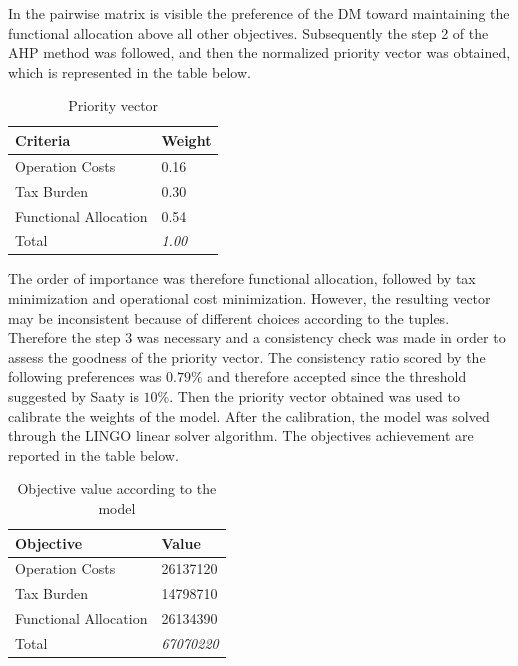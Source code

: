 \begin{doublespace}
In the pairwise matrix is visible the preference of the DM toward maintaining the functional allocation above all other objectives. Subsequently the step 2 of the AHP method was followed, and then the normalized priority vector was obtained, which is represented in the table below.

\begin{table}[]
\centering
\begin{tabular}{@{}ll@{}}
\toprule
\textbf{Criteria}     & Weight        \\ \midrule
Operation Costs       & 0.16          \\
Tax Burden            & 0.30          \\
Functional Allocation & 0.54          \\
Total                 & \textit{1.00} \\ \bottomrule
\end{tabular}
\caption{Priority vector}
\end{table}

The order of importance was therefore functional allocation, followed by tax minimization and operational cost minimization. However, the resulting vector may be inconsistent because of different choices according to the tuples. Therefore the step 3 was necessary and a consistency check was made in order to assess the goodness of the priority vector.
The consistency ratio scored by the following preferences was $0.79\%$ and therefore accepted since the threshold suggested by Saaty\cite{Saaty1980} is $10\%$. Then the priority vector obtained was used to calibrate the weights of the model. After the calibration, the model was solved through the LINGO\cite{Cunningham2004} linear solver algorithm. The objectives achievement are reported in the table below.

\begin{table}[]
\centering
\begin{tabular}{@{}ll@{}}
\toprule
\textbf{Objective}    & Value         \\ \midrule
Operation Costs       & 26137120     \\
Tax Burden	      & 14798710     \\
Functional Allocation & 26134390     \\
Total                 & \textit{67070220} \\ \bottomrule
\end{tabular}
\caption{Objective value according to the model}
\end{table}


\end{doublespace}
